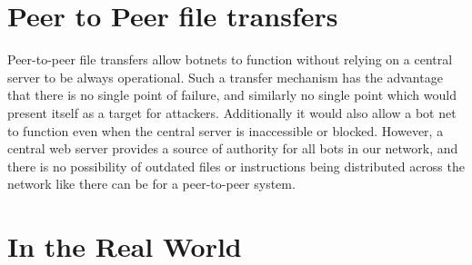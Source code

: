 \documentclass[12pt,a4paper]{article}
\begin{document}
\section{Peer to Peer file transfers}
Peer-to-peer file transfers allow botnets to function without relying on a central server to be always operational. Such a transfer mechanism has the advantage that there is no single point of failure, and similarly no single point which would present itself as a target for attackers. Additionally it would also allow a bot net to function even when the central server is inaccessible or blocked. However, a central web server provides a source of authority for all bots in our network, and there is no possibility of outdated files or instructions being distributed across the network like there can be for a peer-to-peer system.

\section{In the Real World}
\end{document}
